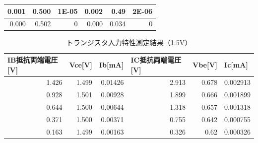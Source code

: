 \documentclass[titlepage]{jarticle}
\begin{document}
\begin{table}[htbp]
\begin{center}
\begin{tabular}{r|r|r|r|r|r}
            0.001                                  & 0.500                       & 1E-05                       & 0.002                                  & 0.49                        & 2E-06                      \\ \hline
            0.000                                  & 0.502                       & 0                           & 0.000                                  & 0.034                       & 0                          \\ \hline
        \end{tabular}
    \end{center}
    \label{トランジスタ入力特性測定結果（0.5V）}
\end{table}

\begin{table}[htbp]
    \caption{トランジスタ入力特性測定結果（1.5V）}
    \begin{center}
        \begin{tabular}{r|r|r|r|r|r}
            \hline\hline
            \multicolumn{1}{l|}{IB抵抗両端電圧[V]} & \multicolumn{1}{l|}{Vce[V]} & \multicolumn{1}{l|}{Ib[mA]} & \multicolumn{1}{l|}{IC抵抗両端電圧[V]} & \multicolumn{1}{l|}{Vbe[V]} & \multicolumn{1}{l}{Ic[mA]} \\ \hline
            1.426                                  & 1.499                       & 0.01426                     & 2.913                                  & 0.678                       & 0.002913                   \\ \hline
            0.928                                  & 1.501                       & 0.00928                     & 1.899                                  & 0.666                       & 0.001899                   \\ \hline
            0.644                                  & 1.500                       & 0.00644                     & 1.318                                  & 0.657                       & 0.001318                   \\ \hline
            0.371                                  & 1.500                       & 0.00371                     & 0.755                                  & 0.642                       & 0.000755                   \\ \hline
            0.163                                  & 1.499                       & 0.00163                     & 0.326                                  & 0.62                        & 0.000326                   \\ \hline

\end{tabular}
\end{center}
\end{table}
\end{document}
